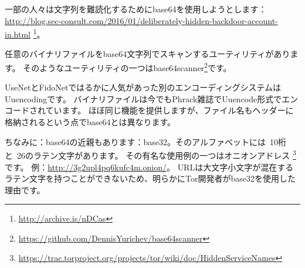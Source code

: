 一部の人々は文字列を難読化するためにbase64を使用しようとします：
\url{http://blog.sec-consult.com/2016/01/deliberately-hidden-backdoor-account-in.html}
\footnote{\url{http://archive.is/nDCas}}。

任意のバイナリファイルをbase64文字列でスキャンするユーティリティがあります。
そのようなユーティリティの一つはbase64scanner\footnote{\url{https://github.com/DennisYurichev/base64scanner}}です。

UseNetとFidoNetではるかに人気があった別のエンコーディングシステムはUuencodingです。
バイナリファイルは今でもPhrack雑誌でUuencode形式でエンコードされています。
ほぼ同じ機能を提供しますが、ファイル名もヘッダーに格納されるという点でbase64とは異なります。

ちなみに：base64の近親もあります：base32。そのアルファベットには~10桁と~26のラテン文字があります。
その有名な使用例の一つはオニオンアドレス
\footnote{\url{https://trac.torproject.org/projects/tor/wiki/doc/HiddenServiceNames}}です。
例：\url{http://3g2upl4pq6kufc4m.onion/}。
\ac{URL}は大文字小文字が混在するラテン文字を持つことができないため、明らかにTor開発者がbase32を使用した理由です。